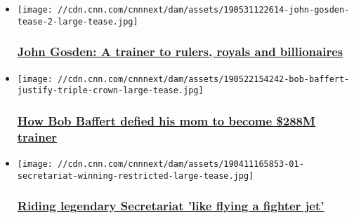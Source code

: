 \begin{itemize}
\item
  \href{/2019/06/11/sport/john-gosden-horse-racing-trainer-kings-rulers-royals-winning-post-spt-intl/index.html}{}

  \texttt{[image: //cdn.cnn.com/cnnnext/dam/assets/190531122614-john-gosden-tease-2-large-tease.jpg]}

  \hypertarget{john-gosden-a-trainer-to-rulers-royals-and-billionaires}{%
  \subsubsection{\texorpdfstring{\href{/2019/06/11/sport/john-gosden-horse-racing-trainer-kings-rulers-royals-winning-post-spt-intl/index.html}{John
  Gosden: A trainer to rulers, royals and
  billionaires}}{John Gosden: A trainer to rulers, royals and billionaires}}\label{john-gosden-a-trainer-to-rulers-royals-and-billionaires}}
\end{itemize}

\begin{itemize}
\item
  \href{/2019/06/06/sport/bob-baffert-profile-winning-post-kentucky-derby-spt-intl/index.html}{}

  \texttt{[image: //cdn.cnn.com/cnnnext/dam/assets/190522154242-bob-baffert-justify-triple-crown-large-tease.jpg]}

  \hypertarget{how-bob-baffert-defied-his-mom-to-become-288m-trainer}{%
  \subsubsection{\texorpdfstring{\href{/2019/06/06/sport/bob-baffert-profile-winning-post-kentucky-derby-spt-intl/index.html}{How
  Bob Baffert defied his mom to become \$288M
  trainer}}{How Bob Baffert defied his mom to become \$288M trainer}}\label{how-bob-baffert-defied-his-mom-to-become-288m-trainer}}
\end{itemize}

\begin{itemize}
\item
  \href{/2019/05/02/sport/secretariat-triple-crown-horse-racing-ron-turcotte-winning-post-spt-intl/index.html}{}

  \texttt{[image: //cdn.cnn.com/cnnnext/dam/assets/190411165853-01-secretariat-winning-restricted-large-tease.jpg]}

  \hypertarget{riding-legendary-secretariat-like-flying-a-fighter-jet}{%
  \subsubsection{\texorpdfstring{\href{/2019/05/02/sport/secretariat-triple-crown-horse-racing-ron-turcotte-winning-post-spt-intl/index.html}{Riding
  legendary Secretariat 'like flying a fighter
  jet'}}{Riding legendary Secretariat 'like flying a fighter jet'}}\label{riding-legendary-secretariat-like-flying-a-fighter-jet}}
\end{itemize}

